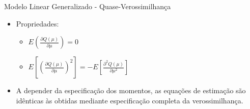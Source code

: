 \documentclass[10pt, aspectratio=169]{beamer}
\begin{document}


\begin{frame}{Modelo Linear Generalizado - Quase-Verossimilhança} 

\begin{itemize}

\item Propriedades:

\vspace{0.5cm}

\begin{itemize}

\item $ E\left ( \frac{\partial Q(\mu)}{\partial \mu} \right ) = 0 $

\vspace{0.5cm}

\item $ E\left [ \left ( \frac{\partial Q(\mu)}{\partial \mu} \right )^2 \right ]=
-E\left [ \frac{\partial^2Q(\mu)}{\partial \mu^2} \right ] $

\end{itemize}

\vspace{0.5cm}

\item A depender da especificação dos momentos, as equações de estimação são idênticas às obtidas mediante especificação completa da verossimilhança. 


\end{itemize}

\end{frame}





\end{document}
